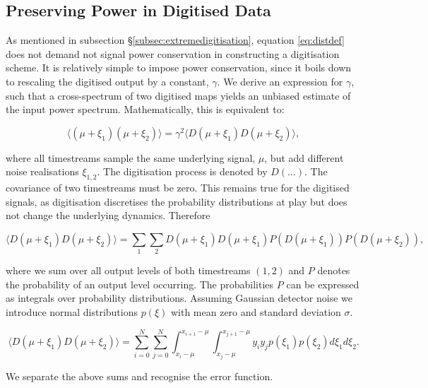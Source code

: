 \documentclass[apj]{emulateapj}
\begin{document}
\subsection{Preserving Power in Digitised Data}
\label{subsec:appendixpreservepower}

As mentioned in subsection \S\ref{subsec:extremedigitisation}, equation \ref{eq:distdef} does not demand not signal power conservation in constructing a digitisation scheme. It is relatively simple to impose power conservation, since it boils down to rescaling the digitised output by a constant, $\gamma$. We derive an expression for $\gamma$, such that a cross-spectrum of two digitised maps yields an unbiased estimate of the input power spectrum. Mathematically, this is equivalent to:

\begin{equation} \label{eq:normcrosspower}
\langle (\mu + \xi_1) (\mu + \xi_2) \rangle = \gamma^2 \langle D(\mu + \xi_1) D(\mu + \xi_2) \rangle,
\end{equation}

where all timestreams sample the same underlying signal, $\mu$, but add different noise realisations $\xi_{1, 2}$. The digitisation process is denoted by $D(\dots)$. The covariance of two timestreams must be zero. This remains true for the digitised signals, as digitisation discretises the probability distributions at play but does not change the underlying dynamics. Therefore

\begin{equation}
\langle D(\mu + \xi_1) D(\mu + \xi_2) \rangle = \sum_1 \sum_2 D(\mu + \xi_1) D(\mu + \xi_1) P(D(\mu + \xi_1)) P(D(\mu + \xi_2)),
\end{equation}

where we sum over all output levels of both timestreams $(1, 2)$ and $P$ denotes the probability of an output level occurring. The probabilities $P$ can be expressed as integrals over probability distributions. Assuming Gaussian detector noise we introduce normal distributions $p(\xi)$ with mean zero and standard deviation $\sigma$.

\begin{equation}
\langle D(\mu + \xi_1) D(\mu + \xi_2) \rangle = \sum_{i=0}^N \sum_{j=0}^N  \int_{x_i-\mu}^{x_{i+1}-\mu} \int_{x_j-\mu}^{x_{j+1}-\mu} y_i y_j p(\xi_1) p(\xi_2) d\xi_1 d\xi_2.
\end{equation}

We separate the above sums and recognise the error function.
\end{document}
